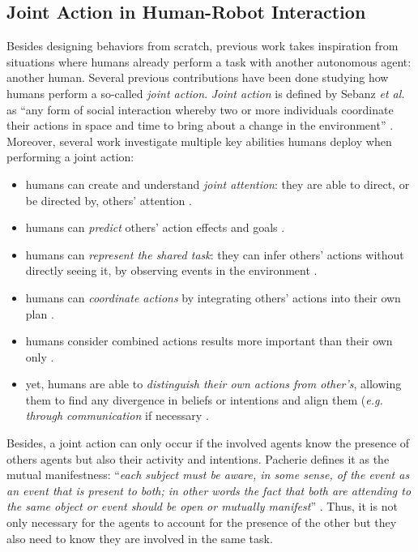 \documentclass[a4paper,11pt,twoside]{StyleThese}
\begin{document}
\subsection{Joint Action in Human-Robot Interaction}

Besides designing behaviors from scratch, previous work takes inspiration from situations where humans already perform a task with another autonomous agent: another human. Several previous contributions have been done studying how humans perform a so-called \textit{joint action}. \textit{Joint action} is defined by Sebanz \textit{et al.} as ``any form of social interaction whereby two or more individuals coordinate their actions in space and time to bring about a change in the environment'' \cite{sebanz2006joint}. Moreover, several work investigate multiple key abilities humans deploy when performing a joint action:
\begin{itemize}
\item humans can create and understand \textit{joint attention}: they are able to direct, or be directed by, others' attention \cite{pacherie_phenomenology_2011, sebanz2006joint}.
\item humans can \textit{predict} others' action effects and goals \cite{tomasello2005understanding, sebanz2006joint}.
\item humans can \textit{represent the shared task}: they can infer others' actions without directly seeing it, by observing events in the environment \cite{knoblich2011psychological, sebanz2006joint}.
\item humans can \textit{coordinate actions} by integrating others' actions into their own plan \cite{sebanz2006joint}.
\item humans consider combined actions results more important than their own only \cite{sebanz2006joint}.
\item yet, humans are able to \textit{distinguish their own actions from other's}, allowing them to find any divergence in beliefs or intentions and align them (\textit{e.g. through communication} if necessary \cite{pacherie_phenomenology_2011}.
\end{itemize}

Besides, a joint action can only occur if the involved agents know the presence of others agents but also their activity and intentions. Pacherie defines it as the mutual manifestness: ``\textit{each subject must be aware, in some sense, of the event as an event that is present to both; in other words the fact that both are attending to the same object or event should be open or mutually manifest}'' \cite{pacherie_phenomenology_2011}. Thus, it is not only necessary for the agents to account for the presence of the other but they also need to know they are involved in the same task.
\end{document}
